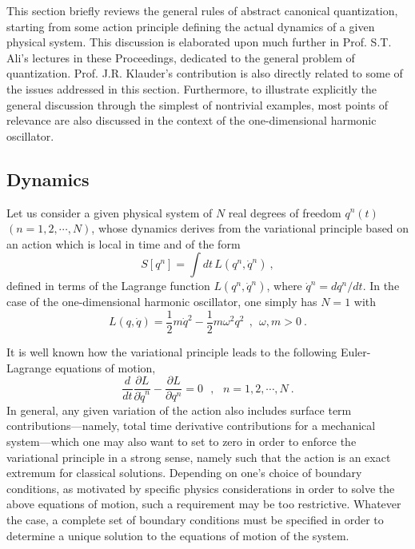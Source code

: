 \documentclass[a4paper,11pt]{article}
\begin{document}
This section briefly reviews\cite{JG1} the general rules of abstract canonical
quantization, starting from some action principle defining the actual
dynamics of a given physical system. This discussion is elaborated upon
much further in Prof. S.T. Ali's lectures in these Proceedings,
dedicated to the general pro\-blem of quantization. Prof. J.R. Klauder's
contribution is also directly related
to some of the issues addressed in this section. Furthermore, to
illustrate ex\-pli\-cit\-ly the general discussion through the simplest of
nontri\-vial examples, most points of relevance are also discussed in the
context of the one-dimensional harmonic oscillator.

\subsection{Dynamics}
\label{Subsect2.1}

Let us consider a given physical system of $N$ real degrees of freedom 
$q^n(t)$ $(n=1,2,\cdots,N)$, whose dynamics derives from the variational 
principle based on an action which is local in time and of the form
\begin{equation}
S[q^n]=\int dt\,L\left(q^n,\dot{q}^n\right)\ ,
\end{equation}
defined in terms of the Lagrange function $L(q^n,\dot{q}^n)$, where
$\dot{q}^n=dq^n/dt$. In the case of the one-dimensional harmonic oscillator, 
one simply has $N=1$ with
\begin{equation}
L(q,\dot{q})=\frac{1}{2}m\dot{q}^2-\frac{1}{2}m\omega^2q^2\ \ ,\ \ 
\omega,m>0\ .
\label{eq:LHO}
\end{equation}

It is well known how the variational principle leads to the following
Euler-Lagrange equations of motion,
\begin{equation}
\frac{d}{dt}\frac{\partial L}{\partial\dot{q}^n}-
\frac{\partial L}{\partial q^n}=0\ \ \ ,\ \ \ n=1,2,\cdots,N\ .
\end{equation}
In general, any given variation of the action also includes surface term
contributions---namely, total time derivative contributions for a
mechanical system---which one may also want to set to zero in order to
enforce the variational principle in a strong sense, namely such that the
action is an exact extremum for classical solutions. Depen\-ding on one's 
choice of boundary conditions, as motivated by specific physics 
considerations in order to solve the above equations of motion, such a 
requirement may be too restrictive. Whatever the case, a complete set of 
boundary conditions must be specified in order to determine a unique 
solution to the equations of motion of the system.
\end{document}
